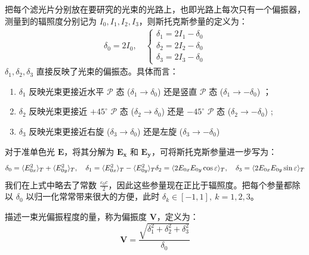 \documentclass[UTF8]{report}
\theoremstyle{MyLineTheoremStyle} %
\theoremstyle{MyBlockTheoremStyle} %
\theoremstyle{MySubsubsectionStyle} %
\begin{document}
把每个滤光片分别放在要研究的光束的光路上，也即光路上每次只有一个偏振器，测量到的辐照度分别记为 $I_0, I_1, I_2, I_3$，则斯托克斯参量的定义为：
\begin{gather}
\delta_0 = 2I_0,\quad 
\begin{cases}
    \delta_1 = 2I_1 - \delta_0 \\ 
    \delta_2 = 2I_2 - \delta_0 \\ 
    \delta_3 = 2I_3 - \delta_0 
\end{cases}
\end{gather}
$\delta_1, \delta_2, \delta_3$ 直接反映了光束的偏振态。具体而言：
\begin{enumerate}
\item $\delta_1$ 反映光束更接近水平 $\mathscr{P}$ 态 ($\delta_1 \to \delta_0$) 还是竖直 $\mathscr{P}$ 态 ($\delta_1 \to -\delta_0$) ；
\item $\delta_2$ 反映光束更接近 $+45^\circ$ $\mathscr{P}$ 态 ($\delta_2 \to \delta_0$) 还是 $-45^\circ$ $\mathscr{P}$ 态 ($\delta_2 \to -\delta_0$) ;
\item $\delta_3$ 反映光束更接近右旋 ($\delta_3 \to \delta_0$) 还是左旋 ($\delta_3 \to -\delta_0$) 
\end{enumerate}
对于准单色光 $\boldsymbol{E}$，将其分解为 $\boldsymbol{E_x}$ 和 $\boldsymbol{E_y}$，可将斯托克斯参量进一步写为：
\begin{equation}
    \delta_0 = \langle E_{0x}^2 \rangle_T + \langle E_{0y}^2 \rangle_T ,\quad 
    \delta_1 = \langle E_{0x}^2 \rangle_T - \langle E_{0y}^2 \rangle_T \\ 
    \delta_2 = \langle 2 E_{0x}E_{0y} \cos \varepsilon \rangle_T ,\quad 
    \delta_3 = \langle 2 E_{0x}E_{0y} \sin \varepsilon \rangle_T 
\end{equation}
我们在上式中略去了常数 $\frac{\varepsilon_0c}{2}$，因此这些参量现在正比于辐照度。把每个参量都除以 $\delta_0$ 以归一化常常带来很大的方便，此时 $\delta_{k} \in [-1, 1], \ k = 1, 2, 3$。

描述一束光偏振程度的量，称为偏振度 $\mathbf{V}$，定义为：
\begin{equation}
\mathbf{V} = \frac{\sqrt{\delta_1^2 + \delta_2^2 + \delta_3^2}}{\delta_0}
\end{equation}
\end{document}

